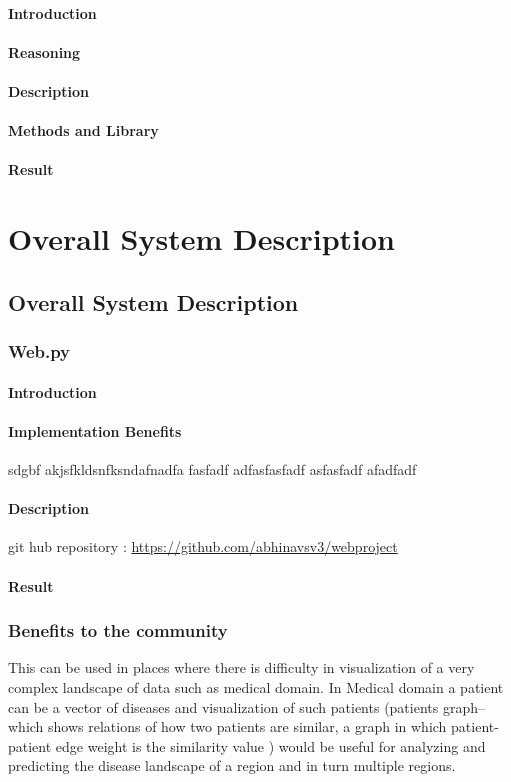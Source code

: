 \subsubsection{Introduction}
\subsubsection{Reasoning}
\subsubsection{Description}
\subsubsection{Methods and Library}
\subsubsection{Result}

\chapter{Overall System Description}
\section{Overall System Description}
\subsection{Web.py}
\subsubsection{Introduction}
\subsubsection{Implementation Benefits}
sdgbf akjsfkldsnfksndafnadfa
fasfadf
adfasfasfadf
asfasfadf
afadfadf
\subsubsection{Description}
git hub repository  : \url{https://github.com/abhinavsv3/webproject}
\subsubsection{Result}
\subsection{Benefits to the community}
This can be used in places where there is difficulty in visualization of a very complex landscape
of data such as medical domain. In Medical domain a patient can be a vector of diseases and
visualization of such patients (patients graph–which shows relations of how two patients are
similar, a graph in which patient-patient edge weight is the similarity value ) would be useful for
analyzing and predicting the disease landscape of a region and in turn multiple regions.

